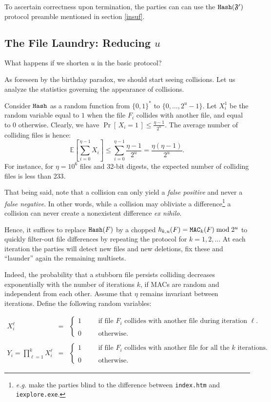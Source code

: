 \documentclass[11pt]{llncs}
\newcommand{\Prob}[1]{{\Pr\left[\,{#1}\,\right]}}
\newcommand{\EE}[1]{{\mathbb{E}\left[{#1}\right]}}
\begin{document}
To ascertain correctness upon termination, the parties can can use the $\mbox{{\tt Hash}}(\mathfrak{F}')$ protocol preamble mentioned in section \ref{insuf}.

\subsection{The File Laundry: Reducing $u$}

What happens if we shorten $u$ in the basic protocol?\smallskip

As foreseen by the birthday paradox, we should start seeing collisions. Let us analyze the statistics governing the appearance of collisions.

Consider $\mbox{{\tt Hash}}$ as a random function from $\{0,1\}^*$ to $\{0,\dots,2^u-1\}$.
Let $X^1_i$ be the random variable equal to $1$ when the file $F_i$ collides with another file, and equal to $0$ otherwise.
Clearly, we have $\Prob{X_i = 1} \le \frac{\eta -1}{2^u}$.
The average number of colliding files is hence:
\[ \EE{\sum_{i=0}^{\eta-1} X_i} \le \sum_{i=0}^{\eta-1} \frac{\eta -1}{2^u} = \frac{\eta (\eta - 1)}{2^u}. \]
For instance, for $\eta=10^6$ files and 32-bit digests, the expected number of colliding files is less than $233$.\smallskip

That being said, note that a collision can only yield a {\sl false positive} and never a {\sl false negative}. In other words, while a collision may obliviate a difference\footnote{{\sl e.g.} make the parties blind to the difference between {\tt index.htm} and {\tt iexplore.exe}.} a collision can never create a nonexistent difference {\sl ex nihilo}.\smallskip

Hence, it suffices to replace $\mbox{{\tt Hash}}(F)$ by a chopped $\hbar_{k,u}(F)=\mbox{{\tt MAC}}_k(F) \bmod 2^u$ to quickly filter-out file differences by repeating the protocol for $k=1,2,\ldots$ At each iteration the parties will detect new files and new deletions, fix these and ``launder'' again the remaining multisets.\smallskip

Indeed, the probability that a stubborn file persists colliding decreases exponentially with the number of iterations $k$, if MACs are random and independent from each other. Assume that $\eta$ remains invariant between iterations. Define the following random variables:\smallskip

$$
\begin{array}{rcl}
X^{\ell}_i & = &
\left\{
\begin{array}{lcl}
1 & ~~~~&  \mbox{if file $F_i$ collides with another file during iteration $\ell$.}\\
\\
0 & ~~~~&  \mbox{otherwise.}
\end{array}
\right.\\
\\
Y_i = \prod_{\ell=1}^k X^{\ell}_i & = &
\left\{
\begin{array}{lcl}
1 & ~~~~&  \mbox{if file $F_i$ collides with another file for all the $k$ iterations.}\\
\\
0 & ~~~~&  \mbox{otherwise.}
\end{array}
\right.
\end{array}$$
\end{document}
